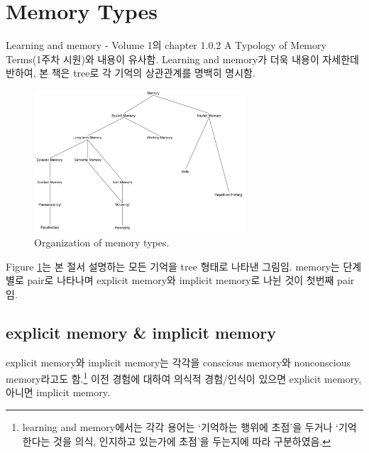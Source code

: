 \documentclass[../note.tex]{subfiles}
\begin{document}
\section{Memory Types}
Learning and memory - Volume 1의 chapter 1.0.2 A Typology of Memory Terms(1주차 시원)와 내용이 유사함.
Learning and memory가 더욱 내용이 자세한데 반하여, 본 책은 tree로 각 기억의 상관관계를 명백히 명시함.

\begin{figure}[h]
  \centering
  \includegraphics[width=0.7\textwidth]{image/memory_tree}
  \caption{Organization of memory types.}
  \label{fig:memory_tree}
\end{figure}

Figure \ref{fig:memory_tree}는 본 절서 설명하는 모든 기억을 tree 형태로 나타낸 그림임.
memory는 단계별로 pair로 나타나며 explicit memory와 implicit memory로 나뉜 것이 첫번째 pair임.

\subsection{explicit memory \& implicit memory}
explicit memory와 implicit memory는 각각을 conscious memory와 nonconscious memory라고도 함.\footnote{
  learning and memory에서는 각각 용어는 `기억하는 행위에 초점'을 두거나 `기억한다는 것을 의식, 인지하고 있는가에 초점'을 두는지에 따라 구분하였음.
}
이전 경험에 대하여 의식적 경험/인식이 있으면 explicit memory, 아니면 implicit memory.
\end{document}
